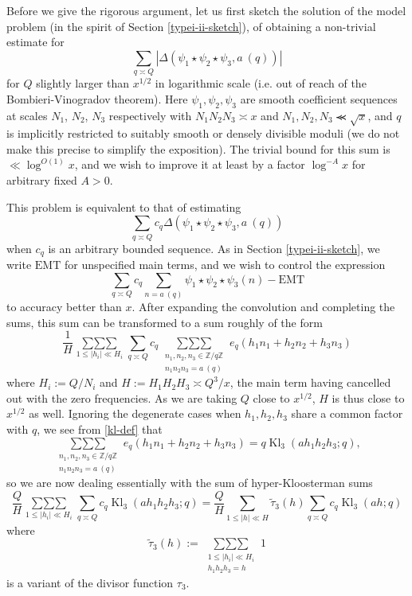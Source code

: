 \documentclass[12pt,a4paper,reqno]{amsart}
\numberwithin{equation}{section}
\DeclareMathOperator{\hypk}{Kl}
\theoremstyle{plain}
\theoremstyle{definition}
\newcommand\Z{\mathbb{Z}}
\newcommand{\emt}{\mathrm{EMT}}
\newcommand\trpsum{\mathop{\sum\sum\sum}\limits}
\renewcommand{\sim}{\asymp}
\renewcommand{\lessapprox}{\llcurly}
\newcommand{\onef}{\mathbf{1}}
\begin{document}
Before we give the rigorous argument, let us first sketch the solution
of the model problem (in the spirit of Section \ref{typei-ii-sketch}),
of obtaining a non-trivial estimate for
\begin{equation}\label{model}
 \sum_{q \sim Q} |\Delta( \psi_1 \star \psi_2 \star \psi_3,a\ (q))|
\end{equation}
for $Q$ slightly larger than $x^{1/2}$ in logarithmic scale (i.e. out
of reach of the Bombieri-Vinogradov theorem). Here
$\psi_1,\psi_2,\psi_3$ are smooth coefficient sequences at scales
$N_1$, $N_2$, $N_3$ respectively with $N_1N_2N_3 \sim x$ and
$N_1,N_2,N_3 \lessapprox \sqrt{x}$, and $q$ is implicitly restricted
to suitably smooth or densely divisible moduli (we do not make this
precise to simplify the exposition).  The trivial bound for this sum
is $\ll \log^{O(1)} x$, and we wish to improve it at least by a factor
$\log^{-A} x$ for arbitrary fixed $A>0$.
\par
This problem is equivalent to that of estimating
$$ 
\sum_{q \sim Q} c_q \Delta( \psi_1 \star \psi_2 \star \psi_3,a\ (q))
$$
when $c_q$ is an arbitrary bounded sequence.  As in Section
\ref{typei-ii-sketch}, we write $\emt$ for unspecified main terms, and
we wish to control the expression
$$ 
\sum_{q \sim Q} c_q \sum_{n = a\ (q)} \psi_1 \star \psi_2 \star
\psi_3(n)-\emt
$$
to accuracy better than $x$.  After expanding the convolution and
completing the sums, this 
sum can be transformed to a sum roughly of the form
$$ 
\frac{1}{H} \trpsum_{1\leq |h_i|\ll H_i} \sum_{q \sim Q} c_q
\trpsum_{\substack{n_1,n_2,n_3 \in\Z/q\Z\\ n_1 n_2 n_3 = a\ (q)}} e_q(
h_1 n_1 + h_2 n_2 + h_3 n_3 )
$$
where $H_i:= Q/N_i$ and $H := H_1H_2 H_3 \sim Q^3/x$, the main term
having cancelled out with the zero frequencies. As we are taking $Q$
close to $x^{1/2}$, $H$ is thus close to $x^{1/2}$ as well.  Ignoring the
degenerate cases when $h_1,h_2,h_3$ share a common factor with $q$, we
see from \eqref{kl-def} that
$$ 
\trpsum_{\substack{n_1,n_2,n_3 \in\Z/q\Z\\ n_1 n_2 n_3 = a\ (q)}} e_q(
h_1 n_1 + h_2 n_2 + h_3 n_3 ) = q \hypk_3( a h_1 h_2 h_3; q ),
$$ 
so we are now dealing essentially with the sum of hyper-Kloosterman
sums
$$
\frac{Q}{H} \trpsum_{1\leq |h_i|\ll H_i} \sum_{q \sim Q} c_q \hypk_3(
ah_1h_2h_3; q)= \frac{Q}{H} \sum_{1\leq |h|\ll H} \tilde \tau_3(h)
\sum_{q \sim Q} c_q \hypk_3(ah;q)
$$ 
where 
$$
\tilde \tau_3(h) := \trpsum_{\substack{1\leq |h_i|\ll H_i\\
    h_1h_2h_3=h}}1
$$ 
is a variant of the divisor function $\tau_3$.  
\end{document}
